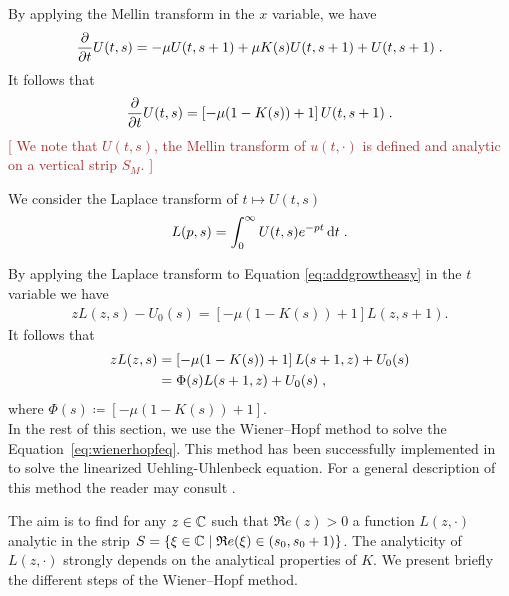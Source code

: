 \documentclass[11pt]{amsart}
\renewcommand{\Re}{\mathfrak{R}e}
\newcommand{\diff}{\,\mathrm{d}}
\newcommand{\ndr}[1]{\textcolor{brown}{[#1]}}
\begin{document}
By applying the Mellin transform in the $x$ variable, we have
	\begin{equation*}
		\frac{\partial}{\partial t} U(t,s) = - \mu U(t,s+1) + \mu K(s) U(t,s+1) + U(t,s+1)
		\; .
	\end{equation*}
It follows that
    \begin{equation}
        \frac{\partial}{\partial t} U(t,s) = \left[- \mu (1-K(s)) + 1\right] U(t,s+1)
		\; .
        \label{eq:addgrowtheasy}
    \end{equation}
    \ndr{
We note that $U(t,s)$, the Mellin transform of $u(t,\cdot)$ is defined and analytic on a vertical strip $S_M$. }

We consider the Laplace transform of $t \mapsto U(t,s)$
\begin{align}
    L(p,s) = \int_0^\infty U(t,s)e^{-pt}\diff t
    \eqfinp
\end{align}

By applying the Laplace transform to Equation \eqref{eq:addgrowtheasy} in the $t$ variable we have 
\begin{align*}
    zL(z,s) - U_0(s) = \left[- \mu (1-K(s)) + 1\right] L(z,s+1).
\end{align*}
It follows that 
\begin{equation}
\begin{aligned}
    \label{eq:wienerhopfeq}
    zL(z,s) 
    &= \left[- \mu (1-K(s)) + 1\right] L(s+1,z) + U_0(s) \\
    &= \Phi(s) L(s+1,z) + U_0(s)
    \; ,
\end{aligned} 
\end{equation}
where $\Phi(s) \coloneqq \left[- \mu (1-K(s)) + 1\right]$. \\

In the rest of this section, we use the Wiener--Hopf method to solve the Equation~\eqref{eq:wienerhopfeq}. This method has been successfully implemented in \cite{escobedo2007fundamental} to solve the linearized Uehling-Uhlenbeck equation. For a general description of this method the reader may consult \cite{zakharov2012kolmogorov}. 
\medskip

The aim is to find for any $z \in \mathbb{C}$ such that $\Re(z) > 0$ a function $L(z, \cdot)$ analytic in the strip $S = \{\xi \in \CC \mid \Re(\xi) \in (s_0, s_0+1)\}$. The analyticity of $L(z, \cdot)$ strongly depends on the analytical properties of $K$. We present briefly the different steps of the Wiener--Hopf method. 
\end{document}
